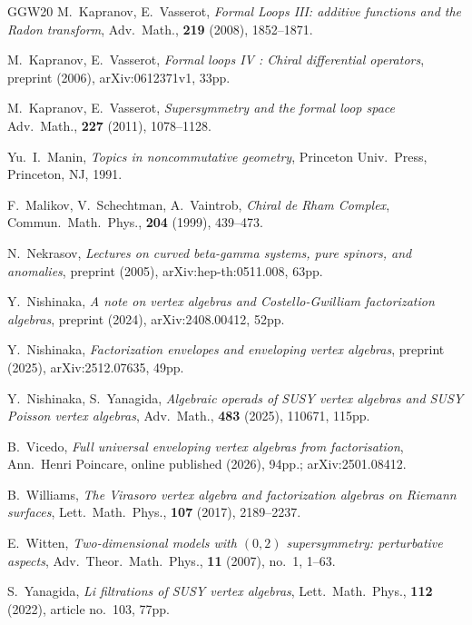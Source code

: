 \documentclass[final,reqno]{amsart}
\numberwithin{equation}{section}
\theoremstyle{definition}
\begin{document}
\begin{thebibliography}{GGW20}
M.\ Kapranov, E.\ Vasserot,
\textit{Formal Loops III: additive functions and the Radon transform}, 
Adv.\ Math., \textbf{219} (2008), 1852--1871.

M.\ Kapranov, E.\ Vasserot,
\textit{Formal loops IV : Chiral differential operators},
preprint (2006), arXiv:0612371v1, 33pp. 

M.\ Kapranov, E.\ Vasserot,
\textit{Supersymmetry and the formal loop space}
Adv.\ Math., \textbf{227} (2011), 1078--1128.

Yu.\ I.\ Manin, 
\emph{Topics in noncommutative geometry}, 
Princeton Univ.\ Press, Princeton, NJ, 1991.

F.\ Malikov, V.\ Schechtman, A.\ Vaintrob, 
\textit{Chiral de Rham Complex}, 
Commun.\ Math.\ Phys., \textbf{204} (1999), 439--473.

N.\ Nekrasov,
\textit{Lectures on curved beta-gamma systems, pure spinors, and anomalies},
preprint (2005), arXiv:hep-th:0511.008, 63pp.

Y.\ Nishinaka,
\textit{A note on vertex algebras and Costello-Gwilliam factorization algebras},
preprint (2024), arXiv:2408.00412, 52pp.

Y.\ Nishinaka,
\textit{Factorization envelopes and enveloping vertex algebras},
preprint (2025), arXiv:2512.07635, 49pp.

Y.\ Nishinaka, S.\ Yanagida,
\textit{Algebraic operads of SUSY vertex algebras and SUSY Poisson vertex algebras},
Adv.\ Math., \textbf{483} (2025), 110671, 115pp.

B.\ Vicedo,
\textit{Full universal enveloping vertex algebras from factorisation},
Ann.\ Henri Poincare, online published (2026), 94pp.; arXiv:2501.08412.

B.\ Williams,
\textit{The Virasoro vertex algebra and factorization algebras on Riemann surfaces},
Lett.\ Math.\ Phys., \textbf{107} (2017), 2189--2237.

E.\ Witten,
\textit{Two-dimensional models with $(0,2)$ supersymmetry: perturbative aspects}, 
Adv.\ Theor.\ Math.\ Phys., \textbf{11} (2007), no.\ 1, 1--63. 

S.\ Yanagida, 
\textit{Li filtrations of SUSY vertex algebras},
Lett.\ Math.\ Phys., \textbf{112} (2022), article no.\ 103, 77pp.

\end{thebibliography}
\end{document}
